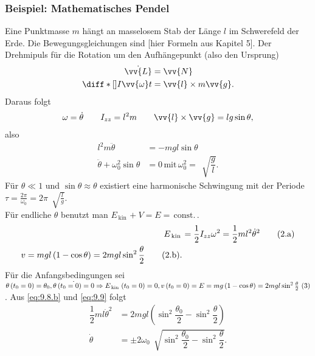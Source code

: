 \documentclass[a4paper,12pt]{article}
\newcommand\inlineeqno{\stepcounter{equation}\ {(\theequation)}}
\newcommand\inlineeqnowoa{\theequation.\text{a}}
\newcommand\inlineeqnowob{\theequation.\text{b}}
\numberwithin{equation}{section}
\begin{document}
\subsubsection{Beispiel: Mathematisches Pendel}
Eine Punktmasse $m$ hängt an masselosem Stab der Länge $l$ im Schwerefeld der Erde. Die Bewegungsgleichungen sind [hier Formeln aus Kapitel 5]. Der Drehmipuls für die Rotation um den Aufhängepunkt (also den Ursprung)
\begin{align*} 
        \dot{\vv{L}}&=\vv{N}\\
        \diff*[]{I\vv{\omega }}{t}&=\vv{l}\times m\vv{g}
.\end{align*} 
Daraus folgt
\begin{align*} 
        \omega =\dot{\theta }\qquad I_{zz}=l^2m\qquad \vv{l}\times \vv{g}=lg\sin \theta 
,\end{align*} 
also
\begin{align} 
        l^2m \ddot{\theta }&=-mgl\sin \theta \nonumber \\
        \ddot{\theta }+\omega _0^2\sin \theta &=0\,\text{mit}\,\omega _0^2=\,\sqrt[]{\dfrac{g}{l}}\label{eq:9.6}
.\end{align} 
Für $\theta \ll 1$ und $\sin \theta \approx \theta $ existiert eine harmonische Schwingung mit der Periode $\tau =\tfrac{2\pi }{\omega _0}=2\pi \,\sqrt[]{\tfrac{l}{g}}$. \\\indent
Für endliche $\theta $ benutzt man $E_{\,\text{kin}\,}+V=E=\,\text{const.}\,$.
\begin{align*} 
        E_{\,\text{kin}\,}&=\dfrac{1}{2}I_{zz}\omega ^2=\dfrac{1}{2}ml^2\dot{\theta }^2\stepcounter{equation}\stepcounter{equation}\tag{\inlineeqnowoa}\label{eq:9.8.a}\\%
        v=mgl\left(1-\cos \theta \right)=2mg l \sin ^2\dfrac{\theta }{2}\tag{\inlineeqnowob}\label{eq:9.8.b}
.\end{align*} 
Für die Anfangsbedingungen sei $\theta \left(t_0=0\right)=\theta _0,\dot{\theta \left(t_0=0\right)=0}\Rightarrow E_{\,\text{kin}\,}\left(t_0=0\right)=0,v\left(t_0=0\right)=E=mg\left(1-\cos \theta \right)=2mgl \sin ^2 \tfrac{\theta }{2}\inlineeqno\label{eq:9.9}$. Aus \eqref{eq:9.8.b} und \eqref{eq:9.9} folgt
\begin{align} 
        \dfrac{1}{2}ml\dot{\theta }^2&=2mgl\left(\sin ^2\dfrac{\theta _0}{2}-\sin ^2\dfrac{\theta }{2}\right)\nonumber \\
        \dot{\theta }&=\pm 2\omega _0\,\sqrt[]{\sin ^2\dfrac{\theta _0}{2}-\sin ^2\dfrac{\theta }{2}}
.\end{align} 
\end{document}
